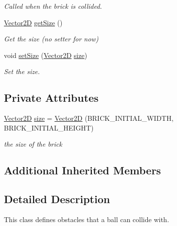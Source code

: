 \begin{DoxyCompactItemize}
\begin{DoxyCompactList}\small\item\em Called when the brick is collided. \end{DoxyCompactList}\item 
\mbox{\label{class_brick_ad3f171a3b9d3bef60781aca97bee31aa}} 
\mbox{\hyperlink{struct_vector2_d}{Vector2D}} \mbox{\hyperlink{class_brick_ad3f171a3b9d3bef60781aca97bee31aa}{get\+Size}} ()
\begin{DoxyCompactList}\small\item\em Get the size (no setter for now) \end{DoxyCompactList}\item 
\mbox{\label{class_brick_ad7328f1157988c6f308f477a7f57b080}} 
void \mbox{\hyperlink{class_brick_ad7328f1157988c6f308f477a7f57b080}{set\+Size}} (\mbox{\hyperlink{struct_vector2_d}{Vector2D}} \mbox{\hyperlink{class_brick_a89dbb0d6711a2af71500f700d90fcbe1}{size}})
\begin{DoxyCompactList}\small\item\em Set the size. \end{DoxyCompactList}\end{DoxyCompactItemize}
\subsection*{Private Attributes}
\begin{DoxyCompactItemize}
\item 
\mbox{\label{class_brick_a89dbb0d6711a2af71500f700d90fcbe1}} 
\mbox{\hyperlink{struct_vector2_d}{Vector2D}} \mbox{\hyperlink{class_brick_a89dbb0d6711a2af71500f700d90fcbe1}{size}} = \mbox{\hyperlink{struct_vector2_d}{Vector2D}} (B\+R\+I\+C\+K\+\_\+\+I\+N\+I\+T\+I\+A\+L\+\_\+\+W\+I\+D\+TH, B\+R\+I\+C\+K\+\_\+\+I\+N\+I\+T\+I\+A\+L\+\_\+\+H\+E\+I\+G\+HT)
\begin{DoxyCompactList}\small\item\em the size of the brick \end{DoxyCompactList}\end{DoxyCompactItemize}
\subsection*{Additional Inherited Members}


\subsection{Detailed Description}
This class defines obstacles that a ball can collide with. 

